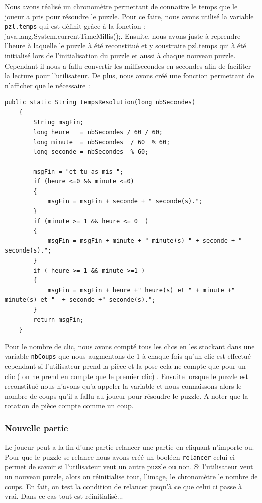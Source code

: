 \documentclass[]{article}
\newcommand{\variable}[1]{\noindent \texttt{#1}}
\begin{document}
Nous avons réalisé un chronomètre permettant de connaitre le temps que le joueur a pris pour résoudre le puzzle. 
Pour ce faire, nous avons utilisé la variable \variable{pzl.temps} qui est définit grâce à la fonction : java.lang.System.currentTimeMillis();. 
Ensuite, nous avons juste à reprendre l'heure à laquelle le puzzle à été reconstitué et y soustraire pzl.temps qui à été initialisé lors de l'initialisation du puzzle et aussi à chaque nouveau puzzle.
Cependant il nous a fallu convertir les millisecondes en secondes afin de faciliter la lecture pour l'utilisateur. De plus, nous avons créé une fonction permettant de n'afficher que le nécessaire : 
\begin{lstlisting}
public static String tempsResolution(long nbSecondes)
    {
        String msgFin;
        long heure   = nbSecondes / 60 / 60;
        long minute  = nbSecondes  / 60  % 60;
        long seconde = nbSecondes  % 60;

        msgFin = "et tu as mis ";
        if (heure <=0 && minute <=0)
        {
            msgFin = msgFin + seconde + " seconde(s).";
        }
        if (minute >= 1 && heure <= 0  )
        {
            msgFin = msgFin + minute + " minute(s) " + seconde + " seconde(s).";
        }
        if ( heure >= 1 && minute >=1 )
        {
            msgFin = msgFin + heure +" heure(s) et " + minute +" minute(s) et "  + seconde +" seconde(s).";
        }
        return msgFin;
    }
\end{lstlisting}
Pour le nombre de clic, nous avons compté tous les clics en les stockant dans une variable \variable{nbCoups} que nous augmentons de 1 à chaque fois qu'un clic est effectué cependant si l'utilisateur prend la pièce et la pose cela ne compte que pour un clic ( on ne prend en compte que le premier clic) . Ensuite lorsque le puzzle est reconstitué nous n'avons qu'a appeler la variable et nous connaissons alors le nombre de coups qu'il a fallu au joueur pour résoudre le puzzle. A noter que la rotation de pièce compte comme un coup.
\subsubsection{Nouvelle partie}

Le joueur peut a la fin d'une partie relancer une partie en cliquant n'importe ou. Pour que le puzzle se relance nous avons créé un booléen \variable{relancer} celui ci permet de savoir si l'utilisateur veut un autre puzzle ou non. Si l'utilisateur veut un nouveau puzzle, alors on réinitialise tout, l'image, le chronomètre le nombre de coups. En fait, on test la condition de relancer jusqu'à ce que celui ci passe à vrai. Dans ce cas tout est réinitialisé... 
\end{document}
